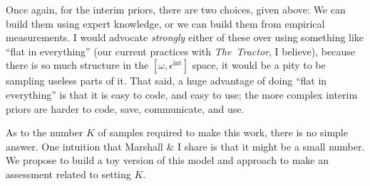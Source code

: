 \documentclass[12pt]{article}
\newcommand{\project}[1]{\textsl{#1}}
\newcommand{\thetractor}{\project{The~Tractor}}
\newcommand{\ellip}{\epsilon}
\newcommand{\intrinsic}{\ellip^{\mathrm{int}}}
\newcommand{\nspars}{\omega}
\begin{document}
Once again, for the interim priors, there are two choices, given above:
We can build them using expert knowledge,
  or we can build them from empirical measurements.
I would advocate \emph{strongly} either of these over using something like ``flat in everything''
  (our current practices with \thetractor, I believe),
  because there is so much structure in the $[\nspars, \intrinsic]$ space,
  it would be a pity to be sampling useless parts of it.
That said, a huge advantage of doing ``flat in everything'' is that it is easy to code,
  and easy to use;
  the more complex interim priors are harder to code, save, communicate, and use.

As to the number $K$ of samples required to make this work,
  there is no simple answer.
One intuition that Marshall \& I share is that it might be a small number.
We propose to build a toy version of this model and approach
  to make an assessment related to setting $K$.
\end{document}
